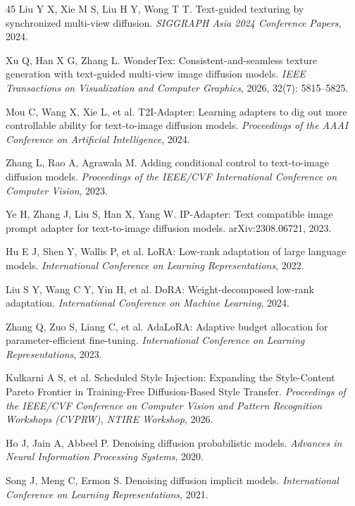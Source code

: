 \documentclass[times,twocolumn,final]{elsarticle}
\begin{document}
\begin{thebibliography}{45}
Liu Y X, Xie M S, Liu H Y, Wong T T. Text-guided texturing by synchronized multi-view diffusion. \textit{SIGGRAPH Asia 2024 Conference Papers}, 2024.

Xu Q, Han X G, Zhang L. WonderTex: Consistent-and-seamless texture generation with text-guided multi-view image diffusion models. \textit{IEEE Transactions on Visualization and Computer Graphics}, 2026, 32(7): 5815--5825.

Mou C, Wang X, Xie L, et al. T2I-Adapter: Learning adapters to dig out more controllable ability for text-to-image diffusion models. \textit{Proceedings of the AAAI Conference on Artificial Intelligence}, 2024.

Zhang L, Rao A, Agrawala M. Adding conditional control to text-to-image diffusion models. \textit{Proceedings of the IEEE/CVF International Conference on Computer Vision}, 2023.

Ye H, Zhang J, Liu S, Han X, Yang W. IP-Adapter: Text compatible image prompt adapter for text-to-image diffusion models. arXiv:2308.06721, 2023.

Hu E J, Shen Y, Wallis P, et al. LoRA: Low-rank adaptation of large language models. \textit{International Conference on Learning Representations}, 2022.

Liu S Y, Wang C Y, Yin H, et al. DoRA: Weight-decomposed low-rank adaptation. \textit{International Conference on Machine Learning}, 2024.

Zhang Q, Zuo S, Liang C, et al. AdaLoRA: Adaptive budget allocation for parameter-efficient fine-tuning. \textit{International Conference on Learning Representations}, 2023.

Kulkarni A S, et al. Scheduled Style Injection: Expanding the Style-Content Pareto Frontier in Training-Free Diffusion-Based Style Transfer. \textit{Proceedings of the IEEE/CVF Conference on Computer Vision and Pattern Recognition Workshops (CVPRW), NTIRE Workshop}, 2026.

Ho J, Jain A, Abbeel P. Denoising diffusion probabilistic models. \textit{Advances in Neural Information Processing Systems}, 2020.

Song J, Meng C, Ermon S. Denoising diffusion implicit models. \textit{International Conference on Learning Representations}, 2021.


\end{thebibliography}
\end{document}
